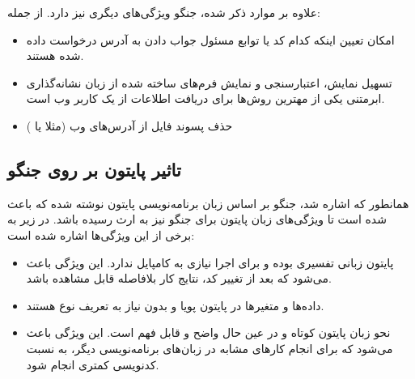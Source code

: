 {علاوه بر موارد ذکر شده، جنگو ویژگی‌های دیگری نیز دارد. از جمله:
\begin{itemize}
	\item امکان تعیین اینکه کدام کد یا توابع مسئول جواب دادن به آدرس درخواست داده شده هستند.
	\item تسهیل نمایش، اعتبارسنجی و نمایش فرم‌های ساخته شده از زبان نشانه‌گذاری ابرمتنی یکی از مهترین روش‌ها برای دریافت اطلاعات از یک کاربر وب است.
	\item حذف پسوند فایل از آدرس‌‌های وب (مثلا  یا )
\end{itemize}
 
\subsection{تاثیر پایتون بر روی جنگو}
همانطور که اشاره شد، جنگو بر اساس زبان برنامه‌نویسی پایتون نوشته شده که باعث شده است تا ویژگی‌های زبان پایتون برای جنگو نیز به ارث رسیده باشد. در زیر به برخی از این ویژگی‌ها اشاره شده است:
\begin{itemize}
	\item پایتون زبانی تفسیری بوده و برای اجرا نیازی به کامپایل ندارد. این ویژگی باعث می‌شود که بعد از تغییر کد، نتایج کار بلافاصله قابل مشاهده باشد.
	\item داده‌ها و متغیر‌ها در پایتون پویا و بدون نیاز به تعریف نوع هستند.
	\item نحو زبان پایتون کوتاه و در عین حال واضح و قابل فهم است. این ویژگی باعث می‌شود که برای انجام کارهای مشابه در زبان‌های برنامه‌نویسی دیگر، به نسبت کدنویسی کمتری انجام شود.
\end{itemize}

 
}
